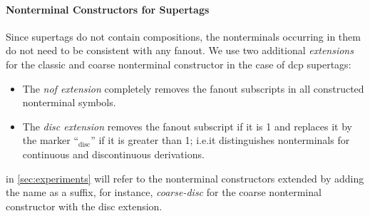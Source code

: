 \documentclass[../../document.tex]{subfiles}
\begin{document}
    \paragraph{Nonterminal Constructors for  Supertags}
    Since  supertags do not contain  compositions, the nonterminals occurring in them do not need to be consistent with any fanout.
    We use two additional \emph{extensions} for the classic and coarse nonterminal constructor in the case of dcp supertags:
    \begin{itemize}
        \item The \emph{nof extension} completely removes the fanout subscripts in all constructed nonterminal symbols.
        \item The \emph{disc extension} removes the fanout subscript if it is 1 and replaces it by the marker ``$_{\text{disc}}$'' if it is greater than 1; i.e.\@ it distinguishes nonterminals for continuous and discontinuous derivations.
    \end{itemize}
    in \cref{sec:experiments} will refer to the nonterminal constructors extended by adding the name as a suffix, for instance, \emph{coarse-disc} for the coarse nonterminal constructor with the disc extension.
\end{document}
